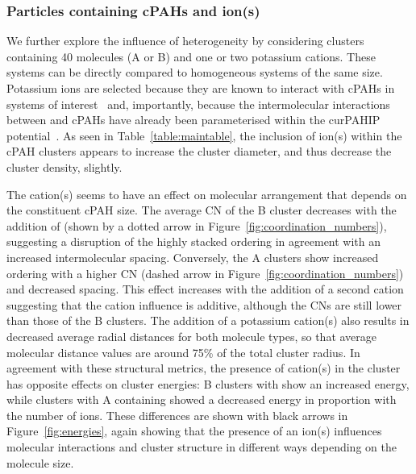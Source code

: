 \subsubsection{Particles containing cPAHs and ion(s)} 
We further explore the influence of heterogeneity by considering clusters containing 40 molecules (A or B) and one or two potassium cations.  These systems can be directly compared to homogeneous systems of the same size. Potassium ions are selected because they are known to interact with cPAHs in systems of interest~\cite{Simonsson2017} and, importantly, because the intermolecular interactions between  and cPAHs have already been parameterised within the curPAHIP potential~\cite{bowal2019ion}. As seen in Table~\ref{table:maintable}, the inclusion of ion(s) within the cPAH clusters appears to increase the cluster diameter, and thus decrease the cluster density, slightly.

The cation(s) seems to have an effect on molecular arrangement that depends on the constituent cPAH size. The average CN of the B cluster decreases with the addition of  (shown by a dotted arrow in Figure~\ref{fig:coordination_numbers}), suggesting a disruption of the highly stacked ordering in agreement with an increased intermolecular spacing. Conversely, the A clusters show increased ordering with a higher CN (dashed arrow in Figure~\ref{fig:coordination_numbers}) and decreased spacing. This effect increases with the addition of a second cation suggesting that the cation influence is additive, although the CNs are still lower than those of the B clusters. %
The addition of a potassium cation(s) also results in decreased average radial distances for both molecule types, so that average molecular distance values are around 75\% of the total cluster radius.
In agreement with these structural metrics, the presence of cation(s) in the cluster has opposite effects on cluster energies: B clusters with  show an increased energy, while clusters with A containing  showed a decreased energy in proportion with the number of ions.  These differences are shown with black arrows in Figure~\ref{fig:energies}, again showing that the presence of an ion(s) influences molecular interactions and cluster structure in different ways depending on the molecule size.

